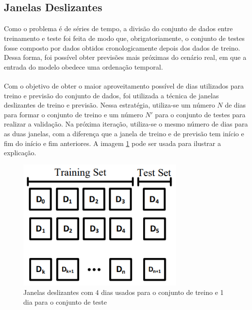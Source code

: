 \documentclass[grad,numbers]{coppe}
\begin{document}
            \subsection{Janelas Deslizantes}
            
                \paragraph{}Como o problema é de séries de tempo, a divisão do conjunto de dados entre treinamento e teste foi feita de modo que, obrigatoriamente, o conjunto de testes fosse composto por dados obtidos cronologicamente depois dos dados de treino. Dessa forma, foi possível obter previsões mais próximas do cenário real, em que a entrada do modelo obedece uma ordenação temporal.
                
                \paragraph{}Com o objetivo de obter o maior aproveitamento possível de dias utilizados para treino e previsão do conjunto de dados, foi utilizada a técnica de janelas deslizantes de treino e previsão. Nessa estratégia, utiliza-se um número $N$ de dias para formar o conjunto de treino e um número $N'$ para o conjunto de testes para realizar a validação. Na próxima iteração, utiliza-se o mesmo número de dias para as duas janelas, com a diferença que a janela de treino e de previsão tem início e fim do início e fim anteriores. A imagem \ref{img:sliding-validation} pode ser usada para ilustrar a explicação.
                
                
                \begin{figure}[h]
                    \caption{Janelas deslizantes com 4 dias usados para o conjunto de treino e 1 dia para o conjunto de teste}
                    \label{img:sliding-validation}
                    \includegraphics[width=8.3cm]{sliding-validation.PNG}
                    \centering
                \end{figure}
                
\end{document}
